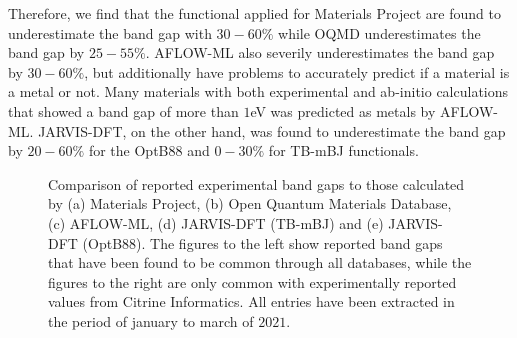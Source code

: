 Therefore, we find that the functional applied for Materials Project are found to underestimate the band gap with $30-60\%$ while OQMD underestimates the band gap by $25-55\%$. AFLOW-ML also severily underestimates the band gap by $30-60\%$, but additionally have problems to accurately predict if a material is a metal or not. Many materials with both experimental and ab-initio calculations that showed a band gap of more than $1$eV was predicted as metals by AFLOW-ML. JARVIS-DFT, on the other hand, was found to underestimate the band gap by $20-60\%$ for the OptB88 and $0-30\%$ for TB-mBJ functionals.




\clearpage
\begin{figure}[ht!]
    \centering
    \begin{subfigure}[t]{1\textwidth}
        \centering
        
        \caption{}
    \end{subfigure}%

    \begin{subfigure}[t]{1\textwidth}
        \centering
        
        \caption{}
    \end{subfigure}

    \begin{subfigure}[t]{1\textwidth}
        \centering
        
        \caption{}
    \end{subfigure}
\end{figure}

\begin{figure}[t!]\ContinuedFloat
    \centering
    \begin{subfigure}[t]{1\textwidth}
        \centering
        
        \caption{}
    \end{subfigure}%

    \begin{subfigure}[t]{1\textwidth}
        \centering
        
        \caption{}
    \end{subfigure}
    \vspace*{-130mm}
    \caption{Comparison of reported experimental band gaps to those calculated by (a) Materials Project, (b) Open Quantum Materials Database, (c) AFLOW-ML, (d) JARVIS-DFT (TB-mBJ) and (e) JARVIS-DFT (OptB88). The figures to the left show reported band gaps that have been found to be common through all databases, while the figures to the right are only common with experimentally reported values from Citrine Informatics. All entries have been extracted in the period of january to march of $2021$. }
    \label{fig:band gaps}
\end{figure}

